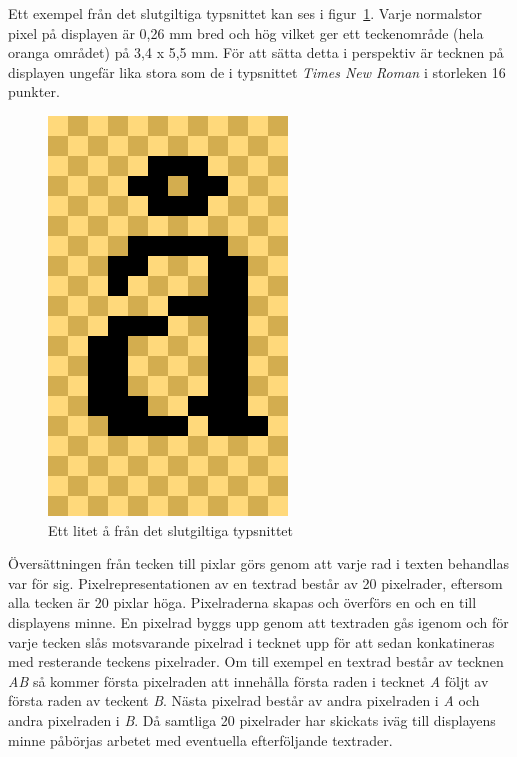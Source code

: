 \documentclass[a4paper,11pt]{article}
\begin{document}
Ett exempel från det slutgiltiga typsnittet kan ses i figur~\ref{fig:fontAA}. Varje normalstor pixel på displayen är 0,26 mm bred och hög vilket ger ett teckenområde (hela oranga området) på 3,4 x 5,5 mm. För att sätta detta i perspektiv är tecknen på displayen ungefär lika stora som de i typsnittet {\it Times New Roman} i storleken 16 punkter.

\begin{figure}[H]
\begin{center}
\includegraphics[scale=0.5, angle=0]{fontAA.png}
\end{center}
\caption{Ett litet å från det slutgiltiga typsnittet}
\label{fig:fontAA}
\end{figure}

Översättningen från tecken till pixlar görs genom att varje rad i texten behandlas var för sig. Pixelrepresentationen av en textrad består av 20 pixelrader, eftersom alla tecken är 20 pixlar höga. Pixelraderna skapas och överförs en och en till displayens minne. En pixelrad byggs upp genom att textraden gås igenom och för varje tecken slås motsvarande pixelrad i tecknet upp för att sedan konkatineras med resterande teckens pixelrader. Om till exempel en textrad består av tecknen {\it AB} så kommer första pixelraden att innehålla första raden i tecknet {\it A} följt av första raden av teckent {\it B}. Nästa pixelrad består av andra pixelraden i {\it A} och andra pixelraden i {\it B}. Då samtliga 20 pixelrader har skickats iväg till displayens minne påbörjas arbetet med eventuella efterföljande textrader.
\end{document}
